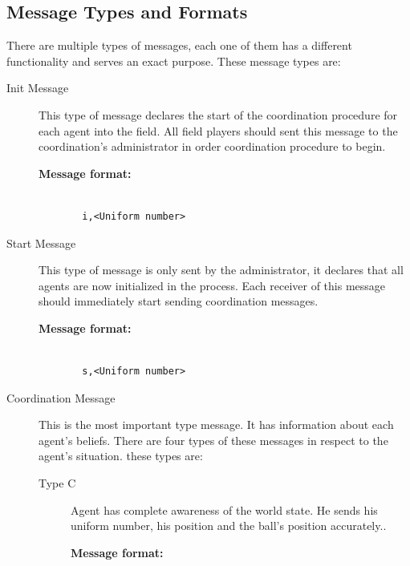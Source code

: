 \subsection{Message Types and Formats}
There are multiple types of messages, each one of them has a different functionality and serves an exact purpose. These message types are:
\begin{description}
\item[Init Message] This type of message declares the start of the coordination procedure for each agent into the field. All field players should sent this message to the coordination's administrator in order coordination procedure to begin.

\begin{description}
  \item[{\bf Message format:}]
  \begin{verbatim} 
  
  i,<Uniform number>
  \end{verbatim}
\end{description}

\item[Start Message] This type of message is only sent by the administrator, it declares that all agents are now initialized in the process. Each receiver of this message should immediately start sending coordination messages.

\begin{description}
  \item[{\bf Message format:}]
  \begin{verbatim} 
  
  s,<Uniform number>
  \end{verbatim}
\end{description}

\item[Coordination Message] This is the most important type message. It has information about each agent's beliefs. There are four types of these messages in respect to the agent's situation. these types are:
\begin{description}

\item[Type C] Agent has complete awareness of the world state. He sends his uniform number, his position and the ball's position accurately..

\begin{description}
  \item[{\bf Message format:}]
  \begin{verbatim}
  

\end{verbatim}
\end{description}
\end{description}
\end{description}

